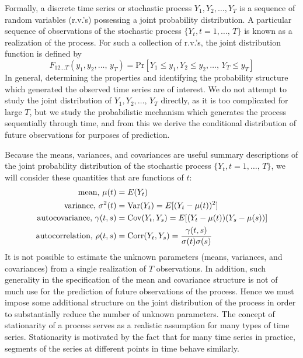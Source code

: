 Formally, a discrete time series or stochastic process $Y_1, Y_2, \ldots, Y_T$ is a sequence of random variables (r.v.'s) possessing a joint probability distribution. A particular sequence of observations of the stochastic process $\{ Y_t, t=1, \ldots,  \, T\}$ is known as a realization of the process. For such a collection of r.v.'s, the joint distribution function is defined by
	\begin{equation}\label{eqn:feqnfirst}
	F_{12 \ldots T}\left(y_1, y_2, \ldots,  \, y_T\right)= \text{Pr}[Y_1 \leq y_1, Y_2 \leq y_2, \ldots,  	\, Y_T \leq y_T]
	\end{equation}
In general, determining the properties and identifying the probability structure which generated the observed time series are of interest. We do not attempt to study the joint distribution of $Y_1, Y_2, \ldots, \, Y_T$ directly, as it is too complicated for large $T$, but we study the probabilistic mechanism which generates the process sequentially through time, and from this we derive the conditional distribution of future observations for purposes of prediction.


Because the means, variances, and covariances are useful summary descriptions of the joint probability distribution of the stochastic process $\{ Y_t, t=1, \ldots,  \, T\}$, we will consider these quantities that are functions of $t$:
	\begin{equation}\label{eqn:texteqn}
	\begin{split}
	\text{mean, }\mu(t)&=E(Y_t) \\
	\text{variance, }\sigma^2(t)&=\Var(Y_t)=E[(Y_t-\mu(t))^2] \\
	\text{autocovariance, }\gamma(t,s)&=\Cov(Y_t,Y_s)=E[(Y_t-\mu(t))(Y_s-\mu(s))] \\
	\text{autocorrelation, }\rho(t,s)&=\Corr(Y_t,Y_s)=\dfrac{\gamma(t,s)}{\sigma(t)\sigma(s)}
	\end{split}
	\end{equation}
It is not possible to estimate the unknown parameters (means, variances, and covariances) from a single realization of $T$ observations. In addition, such generality in the specification of the mean and covariance structure is not of much use for the prediction of future observations of the process. Hence we must impose some additional structure on the joint distribution of the process in order to substantially reduce the number of unknown parameters. The concept of stationarity of a process serves as a realistic assumption for many types of time series. Stationarity is motivated by the fact that for many time series in practice, segments of the series at different points in time behave similarly. \\


